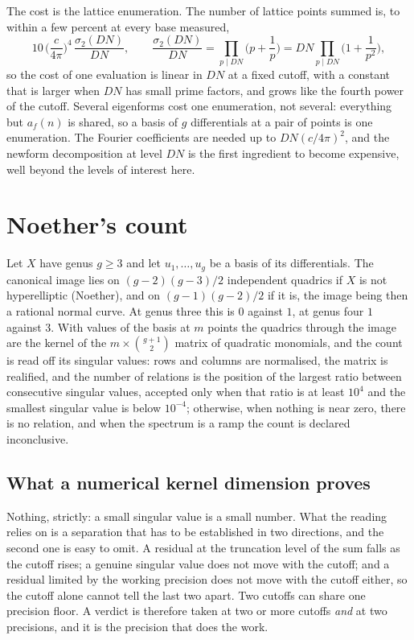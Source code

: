 \documentclass[11pt,reqno]{amsart}
\theoremstyle{plain}
\theoremstyle{definition}
\begin{document}
The cost is the lattice enumeration. The number of lattice points summed is, to within a few
percent at every base measured,
\[
10\,\Big(\frac{c}{4\pi}\Big)^4\,\frac{\sigma_2(DN)}{DN},\qquad
\frac{\sigma_2(DN)}{DN}=\prod_{p\mid DN}\Big(p+\frac1p\Big)=DN\prod_{p\mid DN}\Big(1+\frac1{p^2}\Big),
\]
so the cost of one evaluation is linear in $DN$ at a fixed cutoff, with a constant that is
larger when $DN$ has small prime factors, and grows like the fourth power of the cutoff. Several
eigenforms cost one enumeration, not several: everything but $a_f(n)$ is shared, so a basis of
$g$ differentials at a pair of points is one enumeration. The Fourier coefficients are needed up
to $DN(c/4\pi)^2$, and the newform decomposition at level $DN$ is the first ingredient to become
expensive, well beyond the levels of interest here.

\section{Noether's count}

Let $X$ have genus $g\ge3$ and let $u_1,\dots,u_g$ be a basis of its differentials. The canonical
image lies on $(g-2)(g-3)/2$ independent quadrics if $X$ is not hyperelliptic (Noether), and on
$(g-1)(g-2)/2$ if it is, the image being then a rational normal curve. At genus three this is
$0$ against $1$, at genus four $1$ against $3$. With values of the basis at $m$ points the
quadrics through the image are the kernel of the $m\times\binom{g+1}{2}$ matrix of quadratic
monomials, and the count is read off its singular values: rows and columns are normalised, the
matrix is realified, and the number of relations is the position of the largest ratio between
consecutive singular values, accepted only when that ratio is at least $10^4$ and the smallest
singular value is below $10^{-4}$; otherwise, when nothing is near zero, there is no relation, and
when the spectrum is a ramp the count is declared inconclusive.

\subsection*{What a numerical kernel dimension proves}
Nothing, strictly: a small singular value is a small number. What the reading relies on is a
separation that has to be established in two directions, and the second one is easy to omit.
A residual at the truncation level of the sum falls as the cutoff rises; a genuine singular value
does not move with the cutoff; and a residual limited by the working precision does not move with
the cutoff either, so the cutoff alone cannot tell the last two apart. Two cutoffs can share one
precision floor. A verdict is therefore taken at two or more cutoffs \emph{and} at two
precisions, and it is the precision that does the work.
\end{document}
